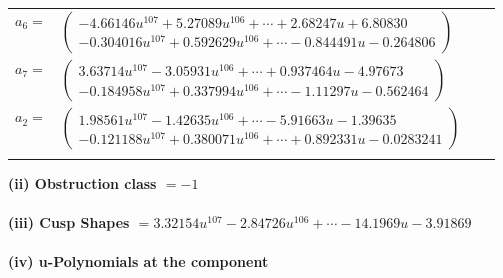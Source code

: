 \documentclass[1p]{elsarticle_modified}
\theoremstyle{definition}
\begin{document}
\begin{tabular}{m{7pt} m{180pt} m{7pt} m{180pt} }
\flushright $a_{6}=$&$\begin{pmatrix}-4.66146 u^{107}+5.27089 u^{106}+\cdots+2.68247 u+6.80830\\-0.304016 u^{107}+0.592629 u^{106}+\cdots-0.844491 u-0.264806\end{pmatrix}$ \\
\flushright $a_{7}=$&$\begin{pmatrix}3.63714 u^{107}-3.05931 u^{106}+\cdots+0.937464 u-4.97673\\-0.184958 u^{107}+0.337994 u^{106}+\cdots-1.11297 u-0.562464\end{pmatrix}$ \\
\flushright $a_{2}=$&$\begin{pmatrix}1.98561 u^{107}-1.42635 u^{106}+\cdots-5.91663 u-1.39635\\-0.121188 u^{107}+0.380071 u^{106}+\cdots+0.892331 u-0.0283241\end{pmatrix}$\\&\end{tabular}
\flushleft \textbf{(ii) Obstruction class $= -1$}\\~\\
\flushleft \textbf{(iii) Cusp Shapes $= 3.32154 u^{107}-2.84726 u^{106}+\cdots-14.1969 u-3.91869$}\\~\\
\newpage\renewcommand{\arraystretch}{1}
\flushleft \textbf{(iv) u-Polynomials at the component}\newline \\
\end{document}
